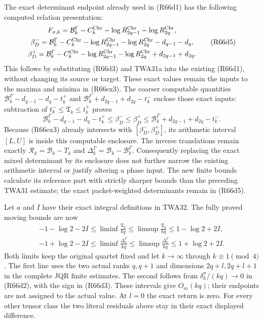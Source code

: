 The exact determinant endpoint already used in (R66d1)
has the following computed relation presentation:
\[
\begin{gathered}
 F_{\sigma,k}=\mathcal B_k^\Gamma-C_k^{\rm Chr}
                 -\log R_{2q-1}^{\rm Chr}-\log R_{2q}^{\rm Chr},\\
 \beta_D^-=\mathcal B_k^\Gamma-C_k^{\rm Chr}
 -\log R_{2q-1}^{\rm Chr}-\log R_{2q}^{\rm Chr}-d_{q-1}-d_q,\\
 \beta_D^+=\mathcal B_k^\Gamma-C_k^{\rm Chr}
 -\log R_{2q-1}^{\rm Chr}-\log R_{2q}^{\rm Chr}+d_{2q-1}+d_{2q}.
\end{gathered}\tag{R66d5}
\]
This follows by substituting (R66d3) and TWA31a into the
existing (R66d1), without changing its source or target.
These exact values remain the inputs to the maxima and
minima in (R66ex3). The coarser computable quantities
$\mathcal B_k^\Gamma-d_{q-1}-d_q-t_k^+$ and
$\mathcal B_k^\Gamma+d_{2q-1}+d_{2q}-t_k^-$
enclose those exact inputs: subtraction of
$t_k^-\leq\mathfrak T_k\leq t_k^+$ proves
\[
 \mathcal B_k^\Gamma-d_{q-1}-d_q-t_k^+
 \leq\beta_D^-\leq\beta_D^+
 \leq\mathcal B_k^\Gamma+d_{2q-1}+d_{2q}-t_k^-.
\]
Because (R66ex3) already intersects with
$[\beta_D^-,\beta_D^+]$, its arithmetic interval
$[L,U]$ is inside this computable enclosure.
The inverse translations remain exactly
$\mathcal R_k=\mathcal B_k-T_k$ and
$\Delta_k^\Gamma=\mathcal B_k-\mathcal B_k^\Gamma$.
Consequently replacing the exact mixed determinant by
its enclosure does not further narrow the existing
arithmetic interval or justify altering a phase input.
The new finite bounds calculate its reference part with
strictly sharper bounds than the preceding TWA31 estimate;
the exact packet-weighted determinants remain in (R66d5).

Let $a$ and $I$ have their exact integral definitions in
TWA32. The fully proved moving bounds are now
\[
\begin{gathered}
 -1-\log2-2I\leq\liminf\frac{\mathfrak T_k}{kq}
 \leq\limsup\frac{\mathfrak T_k}{kq}\leq1-\log2+2I,\\
 -1+\log2-2I\leq\liminf\frac{\Delta_k^\Gamma}{kq}
 \leq\limsup\frac{\Delta_k^\Gamma}{kq}\leq1+\log2+2I.
\end{gathered}\tag{R66d6}
\]
Both limits keep the original quartet fixed and let
$k\to\infty$ through $k\equiv1\pmod4$.
The first line uses the two actual ranks $q,q+1$ and
dimensions $2q+l,2q+l+1$ in the complete JQR finite
estimates. The second follows from
$\delta_k^\sigma/(kq)\to0$ in (R66d2), with the sign
in (R66d3). These intervals give $O_m(kq)$; their
endpoints are not assigned to the actual value.
At $l=0$ the exact return is zero. For every other
tensor class the two literal residuals above stay
in their exact displayed difference.